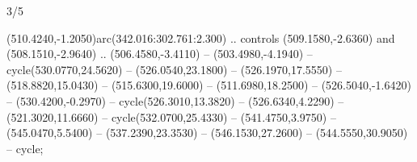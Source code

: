 \begin{flagdescription}{3/5}
\begin{scope} [xshift=0.5\flagwidth*\stretchfactor,yshift=0.5\flagwidth,scale=\flagwidth/391]
\begin{scope}[y=0.8pt, x=0.8pt, yscale=-1, xscale=1,line width=0.01\lw,shift={(-98.875,-338.125)}]
\begin{scope}[cm={{0.15382,0.0,0.0,0.15382,(34.72393,273.11413)}}]
  (510.4240,-1.2050)arc(342.016:302.761:2.300) .. controls (509.1580,-2.6360)
  and (508.1510,-2.9640) .. (506.4580,-3.4110) -- (503.4980,-4.1940) --
  cycle(530.0770,24.5620) -- (526.0540,23.1800) -- (526.1970,17.5550) --
  (518.8820,15.0430) -- (515.6300,19.6000) -- (511.6980,18.2500) --
  (526.5040,-1.6420) -- (530.4200,-0.2970) -- cycle(526.3010,13.3820) --
  (526.6340,4.2290) -- (521.3020,11.6660) -- cycle(532.0700,25.4330) --
  (541.4750,3.9750) -- (545.0470,5.5400) -- (537.2390,23.3530) --
  (546.1530,27.2600) -- (544.5550,30.9050) -- cycle;
\end{scope}
\end{scope}
\end{scope}
\fi
\framecode{}
\end{flagdescription}
